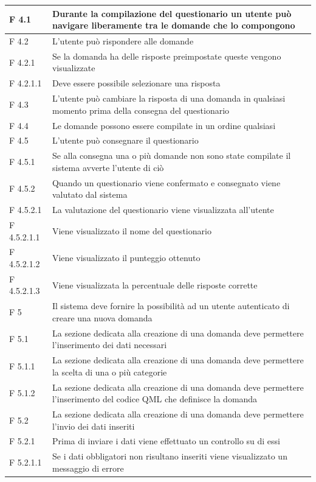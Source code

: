 \documentclass[a4paper,11pt]{article}
\begin{document}
\begin{longtable}{p{}p{}}
\midrule
F 4.1 & Durante la compilazione del questionario un utente può navigare liberamente tra le domande che lo compongono\\
\midrule
F 4.2 & L'utente può rispondere alle domande\\
\midrule
F 4.2.1 & Se la domanda ha delle risposte preimpostate queste vengono visualizzate\\
\midrule
F 4.2.1.1 & Deve essere possibile selezionare una risposta\\
\midrule
F 4.3 & L'utente può cambiare la risposta di una domanda in qualsiasi momento prima della consegna del questionario\\
\midrule
F 4.4 & Le domande possono essere compilate in un ordine qualsiasi\\
\midrule
F 4.5 & L'utente può consegnare il questionario\\
\midrule
F 4.5.1 & Se alla consegna una o più domande non sono state compilate il sistema avverte l'utente di ciò\\
\midrule
F 4.5.2 & Quando un questionario viene confermato e consegnato viene valutato dal sistema\\
\midrule
F 4.5.2.1 & La valutazione del questionario viene visualizzata all'utente\\
\midrule
F 4.5.2.1.1 & Viene visualizzato il nome del questionario\\
\midrule
F 4.5.2.1.2 & Viene visualizzato il punteggio ottenuto\\
\midrule
F 4.5.2.1.3 & Viene visualizzata la percentuale delle risposte corrette\\
\midrule
F 5 & Il sistema deve fornire la possibilità ad un utente autenticato di creare una nuova domanda\\
\midrule
F 5.1 & La sezione dedicata alla creazione di una domanda deve permettere l'inserimento dei dati necessari\\
\midrule
F 5.1.1 & La sezione dedicata alla creazione di una domanda deve permettere la scelta di una o più categorie\\
\midrule
F 5.1.2 & La sezione dedicata alla creazione di una domanda deve permettere l'inserimento del codice QML che definisce la domanda\\
\midrule
F 5.2 & La sezione dedicata alla creazione di una domanda deve permettere l'invio dei dati inseriti\\
\midrule
F 5.2.1 & Prima di inviare i dati viene effettuato un controllo su di essi\\
\midrule
F 5.2.1.1 & Se i dati obbligatori non risultano inseriti viene visualizzato un messaggio di errore\\

\end{longtable}
\end{document}
